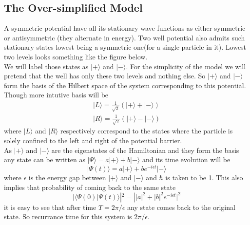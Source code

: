 \documentclass[a4paper,two column]{article}
\begin{document}
            \subsection{The Over-simplified Model}\label{subsec:oversimplifiedmodel}
                A symmetric potential have all its stationary wave functions as either symmetric or antisymmetric (they alternate in energy). Two well potential also admits such stationary states lowest being a symmetric one(for a single particle in it). Lowest two levels looks something like the figure below. \\
                We will label those states as $|+\rangle$ and $|-\rangle$. For the simplicity of the model we will pretend that the well has only these two levels and nothing else. So $|+\rangle$ and $|-\rangle$ form the basis of the Hilbert space of the system corresponding to this potential. Though more intutive basis will be 
                \begin{eqnarray}
                    |L\rangle = \frac{1}{\sqrt{2}}(|+\rangle+|-\rangle)\\
                    |R\rangle = \frac{1}{\sqrt{2}}(|+\rangle-|-\rangle)
                \end{eqnarray}
                where  $|L\rangle$ and  $|R\rangle$ respectively correspond to the states where the particle is solely confined to the left and right of the potential barrier. \\
                As $|+\rangle$ and $|-\rangle$ are the eigenstates of the Hamiltonian and they form the basis any state can be written as $|\Psi\rangle = a|+\rangle + b|-\rangle $ and its time evolution will be 
                \begin{equation}
                    |\Psi(t)\rangle = a |+\rangle + b e^{-i\epsilon t}|-\rangle
                \end{equation}
                where $\epsilon$ is the energy gap between $|+\rangle$ and $|-\rangle$ and $\hbar$ is taken to be 1. This also implies that probability of coming back to the same state 
                \begin{equation}
                    |\langle\Psi(0)|\Psi(t)\rangle|^2 = | |a|^2 + |b|^2 e^{-i\epsilon t}|^2 
                \end{equation}
                it is easy to see that after time $T = 2\pi / \epsilon$ any state comes back to the original state. So recurrance time for this system is $ 2\pi / \epsilon$.
\end{document}
